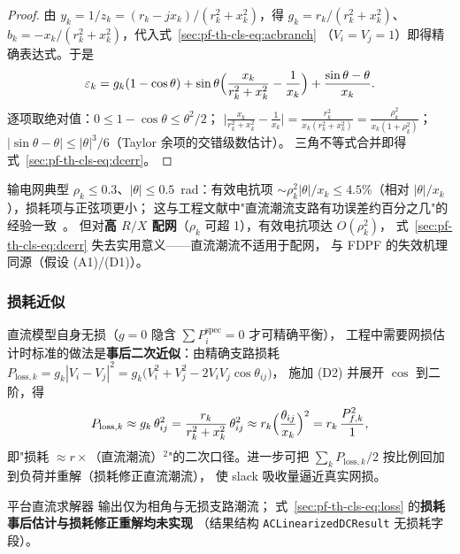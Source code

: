 \begin{proof}
由 $y_k=1/z_k=(r_k-jx_k)/(r_k^2+x_k^2)$，得 $g_k=r_k/(r_k^2+x_k^2)$、
$b_k=-x_k/(r_k^2+x_k^2)$，代入式~\eqref{sec:pf-th-cls-eq:acbranch}
（$V_i=V_j=1$）即得精确表达式。于是
\begin{equation*}
\varepsilon_k=g_k(1-\cos\theta)
+\sin\theta\Bigl(\frac{x_k}{r_k^2+x_k^2}-\frac{1}{x_k}\Bigr)
+\frac{\sin\theta-\theta}{x_k}.
\end{equation*}
逐项取绝对值：$0\le1-\cos\theta\le\theta^2/2$；
$\bigl|\frac{x_k}{r_k^2+x_k^2}-\frac{1}{x_k}\bigr|
=\frac{r_k^2}{x_k(r_k^2+x_k^2)}=\frac{\rho_k^2}{x_k(1+\rho_k^2)}$；
$|\sin\theta-\theta|\le|\theta|^3/6$（Taylor 余项的交错级数估计）。
三角不等式合并即得式~\eqref{sec:pf-th-cls-eq:dcerr}。
\end{proof}

\begin{remark}[误差的量级解读]\label{sec:pf-th-cls-rem-dcerr}
输电网典型 $\rho_k\le0.3$、$|\theta|\le0.5$~rad：有效电抗项
$\sim\rho_k^2|\theta|/x_k\le4.5\%$（相对 $|\theta|/x_k$），损耗项与正弦项更小；
这与工程文献中"直流潮流支路有功误差约百分之几"的经验一致~\cite{cls:stottreview}。
但对\textbf{高 $R/X$ 配网}（$\rho_k$ 可超 1），有效电抗项达 $O(\rho_k^2)$，
式~\eqref{sec:pf-th-cls-eq:dcerr} 失去实用意义——直流潮流不适用于配网，
与 FDPF 的失效机理同源（假设 (A1)/(D1)）。
\end{remark}

\subsubsection{损耗近似}

直流模型自身无损（$g=0$ 隐含 $\sum P_i^{\mathrm{spec}}=0$ 才可精确平衡），
工程中需要网损估计时标准的做法是\textbf{事后二次近似}：由精确支路损耗
$P_{\mathrm{loss},k}=g_k|V_i-V_j|^2=g_k\bigl(V_i^2+V_j^2-2V_iV_j\cos\theta_{ij}\bigr)$，
施加 (D2) 并展开 $\cos$ 到二阶，得
\begin{equation}
P_{\mathrm{loss},k}\approx g_k\,\theta_{ij}^2=\frac{r_k}{r_k^2+x_k^2}\,\theta_{ij}^2
\approx r_k\Bigl(\frac{\theta_{ij}}{x_k}\Bigr)^2
=r_k\,\frac{P_{f,k}^2}{1},
\label{sec:pf-th-cls-eq:loss}
\end{equation}
即"损耗 $\approx r\times$（直流潮流）$^2$"的二次口径。进一步可把
$\sum_k P_{\mathrm{loss},k}/2$ 按比例回加到负荷并重解（损耗修正直流潮流），
使 slack 吸收量逼近真实网损。

\begin{gapnote}
平台直流求解器  输出仅为相角与无损支路潮流；
式~\eqref{sec:pf-th-cls-eq:loss} 的\textbf{损耗事后估计与损耗修正重解均未实现}
（结果结构 \texttt{ACLinearizedDCResult} 无损耗字段）。
\end{gapnote}

